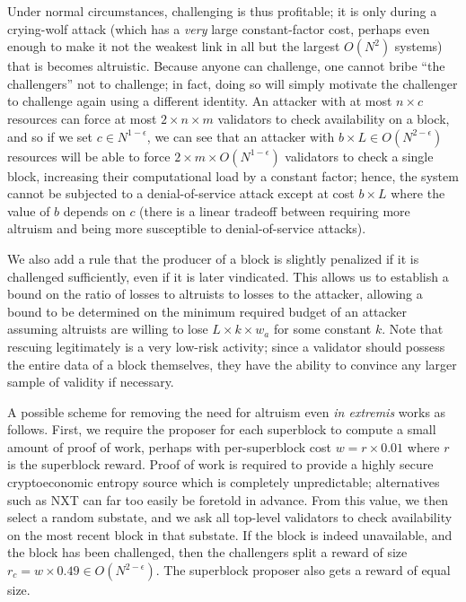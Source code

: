 \documentclass[11pt,a4paper]{report}
\theoremstyle{plain}
\theoremstyle{definition}
\theoremstyle{remark}
\begin{document}
Under normal circumstances, challenging is thus profitable; it is only during a crying-wolf attack (which has a \emph{very} large constant-factor cost, perhaps even enough to make it not the weakest link in all but the largest $O(N^2)$ systems) that is becomes altruistic. Because anyone can challenge, one cannot bribe ``the challengers'' not to challenge; in fact, doing so will simply motivate the challenger to challenge again using a different identity. An attacker with at most $n \times  c$ resources can force at most $2 \times  n \times  m$ validators to check availability on a block, and so if we set $c \in N^{1-\epsilon}$, we can see that an attacker with $b \times  L \in O(N^{2-\epsilon})$ resources will be able to force $2 \times  m \times  O(N^{1-\epsilon})$ validators to check a single block, increasing their computational load by a constant factor; hence, the system cannot be subjected to a denial-of-service attack except at cost $b \times  L$ where the value of $b$ depends on $c$ (there is a linear tradeoff between requiring more altruism and being more susceptible to denial-of-service attacks).

We also add a rule that the producer of a block is slightly penalized if it is challenged sufficiently, even if it is later vindicated. This allows us to establish a bound on the ratio of losses to altruists to losses to the attacker, allowing a bound to be determined on the minimum required budget of an attacker assuming altruists are willing to lose $L \times  k \times  w_a$ for some constant $k$. Note that rescuing legitimately is a very low-risk activity; since a validator should possess the entire data of a block themselves, they have the ability to convince any larger sample of validity if necessary.

A possible scheme for removing the need for altruism even \emph{in extremis} works as follows. First, we require the proposer for each superblock to compute a small amount of proof of work, perhaps with per-superblock cost $w = r \times  0.01$ where $r$ is the superblock reward. Proof of work is required to provide a highly secure cryptoeconomic entropy source which is completely unpredictable; alternatives such as NXT can far too easily be foretold in advance. From this value, we then select a random substate, and we ask all top-level validators to check availability on the most recent block in that substate. If the block is indeed unavailable, and the block has been challenged, then the challengers split a reward of size $r_c = w \times  0.49 \in O(N^{2-\epsilon})$. The superblock proposer also gets a reward of equal size.
\end{document}
